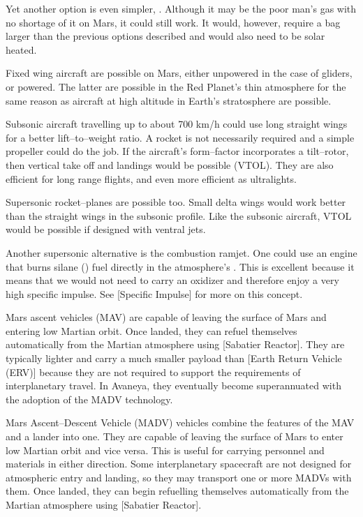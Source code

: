 Yet another option is even simpler, . Although it may be the poor man's gas with no shortage of it on Mars, it could still work. It would, however, require a bag larger than the previous options described and would also need to be solar heated.

Fixed wing aircraft are possible on Mars, either unpowered in the case of gliders, or powered. The latter are possible in the Red Planet's thin atmosphere for the same reason as aircraft at high altitude in Earth's stratosphere are possible.

Subsonic aircraft travelling up to about 700 km/h could use long straight wings for a better lift--to--weight ratio. A rocket is not necessarily required and a simple propeller could do the job. If the aircraft's form--factor incorporates a tilt--rotor, then vertical take off and landings would be possible (VTOL). They are also efficient for long range flights, and even more efficient as ultralights.

Supersonic rocket--planes are possible too. Small delta wings would work better than the straight wings in the subsonic profile. Like the subsonic aircraft, VTOL would be possible if designed with ventral jets.

Another supersonic alternative is the combustion ramjet. One could use an engine that burns silane () fuel directly in the atmosphere's . This is excellent because it means that we would not need to carry an oxidizer and therefore enjoy a very high specific impulse. See [Specific Impulse] for more on this concept.

Mars ascent vehicles (MAV) are capable of leaving the surface of Mars and entering low Martian orbit. Once landed, they can refuel themselves automatically from the Martian atmosphere using [Sabatier Reactor]. They are typically lighter and carry a much smaller payload than [Earth Return Vehicle (ERV)] because they are not required to support the requirements of interplanetary travel. In Avaneya, they eventually become superannuated with the adoption of the MADV technology.

Mars Ascent--Descent Vehicle (MADV) vehicles combine the features of the MAV and a lander into one. They are capable of leaving the surface of Mars to enter low Martian orbit and vice versa. This is useful for carrying personnel and materials in either direction. Some interplanetary spacecraft are not designed for atmospheric entry and landing, so they may transport one or more MADVs with them. Once landed, they can begin refuelling themselves automatically from the Martian atmosphere using [Sabatier Reactor].

